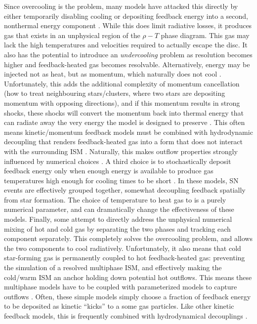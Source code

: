 Since overcooling is the problem, many models have attacked this directly by
either temporarily disabling cooling \citep{Thacker2000,Stinson2006} or
depositing feedback energy into a second, nonthermal energy component
\citep{Agertz2013}.  While this does limit radiative losses, it produces gas
that exists in an unphysical region of the $\rho-T$ phase diagram.  This gas may
lack the high temperatures and velocities required to actually escape the disc.
It also has the potential to introduce an \textit{undercooling} problem as
resolution becomes higher and feedback-heated gas becomes resolvable.
Alternatively, energy may be injected not as heat, but as momentum, which
naturally does not cool
\citep{Navarro1993,Mihos1994,Scannapieco2006,DallaVecchia2008,Dubois2008}.
Unfortunately, this adds the additional complexity of momentum cancellation (how
to treat neighbouring stars/clusters, where two stars are depositing momentum
with opposing directions), and if this momentum results in strong shocks, these
shocks will convert the momentum back into thermal energy that can radiate
away the very energy the model is designed to preserve \citep{Durier2012}.
This often means kinetic/momentum feedback models must be combined with
hydrodynamic decoupling that renders feedback-heated gas into a form that does
not interact with the surrounding ISM \citep{Springel2003,Vogelsberger2013}.
Naturally, this makes outflow properties strongly influenced by numerical
choices \citep{DallaVecchia2008}.  A third choice is to stochastically deposit
feedback energy only when enough energy is available to produce gas temperatures
high enough for cooling times to be short \citep{DallaVecchia2012,Crain2015}.
In these models, SN events are effectively grouped together, somewhat decoupling
feedback spatially from star formation.  The choice of temperature to heat gas
to is a purely numerical parameter, and can dramatically change the
effectiveness of these models.  Finally, some \citep{Springel2003,Murante2015}
attempt to directly address the unphysical numerical mixing of hot and cold gas
by separating the two phases and tracking each component separately.  This
completely solves the overcooling problem, and allows the two components to cool
radiatively.   Unfortunately, it also means that cold star-forming gas is
permanently coupled to hot feedback-heated gas: preventing the simulation of  a
resolved multiphase ISM, and effectively making the cold/warm ISM an anchor
holding down potential hot outflows.  This means these multiphase models have to
be coupled with parameterized models to capture outflows \citep{Springel2003}.
Often, these simple models simply choose a fraction of feedback energy to be
deposited as kinetic ``kicks'' to a some gas particles.  Like other kinetic
feedback models, this is frequently combined with hydrodynamical decouplings
\citep{Vogelsberger2013}.

